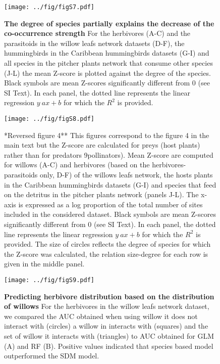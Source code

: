 \newpage

\begin{figure}[htbp]
\centering
\texttt{[image: ../fig/figS7.pdf]}
\caption{\textbf{The degree of species partially explains the decrease
of the co-occurrence strength} For the herbivores (A-C) and the
parasitoids in the willow leafs network datasets (D-F), the hummingbirds
in the Caribbean hummingbirds datasets (G-I) and all species in the
pitcher plants network that consume other species (J-L) the mean Z-score
is plotted against the degree of the species. Black symbols are mean
Z-scores significantly different from 0 (see SI Text). In each panel,
the dotted line represents the linear regression \(y~ax+b\) for which
the \(R^2\) is provided.\label{fig:degree}}
\end{figure}

\newpage

\begin{figure}[htbp]
\centering
\texttt{[image: ../fig/figS8.pdf]}
\caption{*Reversed figure 4** This figures correspond to the figure 4 in
the main text but the Z-score are calculated for preys (host plants)
rather than for predators 9pollinators). Mean Z-score are computed for
willows (A-C) and herbivores (based on the herbivores-parasitoids only,
D-F) of the willows leafs network, the hosts plants in the Caribbean
hummingbirds datasets (G-I) and species that feed on the detritus in the
pitcher plants network (panels J-L). The x-axis is expressed as a log
proportion of the total number of sites included in the considered
dataset. Black symbols are mean Z-scores significantly different from 0
(see SI Text). In each panel, the dotted line represents the linear
regression \(y~ax+b\) for which the \(R^2\) is provided. The size of
circles reflects the degree of species for which the Z-score was
calculated, the relation size-degree for each row is given in the middle
panel.\label{fig:degocc2}}
\end{figure}

\newpage

\begin{figure}[htbp]
\centering
\texttt{[image: ../fig/figS9.pdf]}
\caption{\textbf{Predicting herbivore distribution based on the
distribution of willows} For the herbivores in the willow leafs network
dataset, we compared the AUC obtained when using willow it does not
interact with (circles) a willow in interacts with (squares) and the set
of willow it interacts with (triangles) to AUC obtained for GLM (A) and
RF (B). Positive values indicated that species based model outperformed
the SDM model.\label{fig:ratauc}}
\end{figure}

\newpage

\newpage
